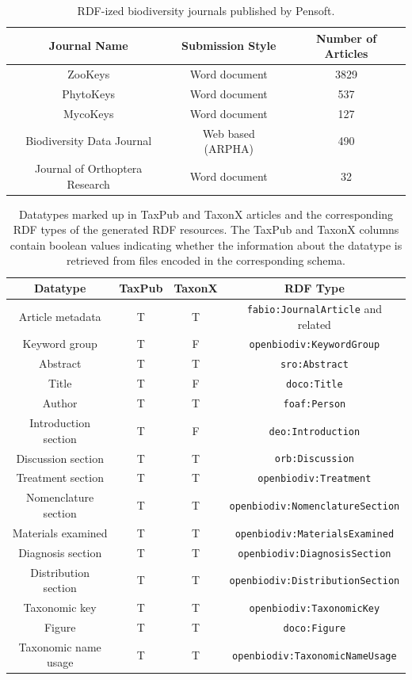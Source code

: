 \begin{table}[h!]
\caption{RDF-ized biodiversity journals published by Pensoft.}
      \begin{tabular}{ccc}
        \hline
          Journal Name             & Submission Style & Number of Articles\\  \hline
          ZooKeys                 & Word document & 3829\\
          PhytoKeys               & Word document & 537\\
          MycoKeys                & Word document & 127\\
          Biodiversity Data Journal & Web based (ARPHA) & 490\\
          Journal of Orthoptera Research & Word document & 32
      \end{tabular}
      \label{rdf-pensoft-journals}
\end{table}

\begin{table}[h!]
\caption{Datatypes marked up in TaxPub and TaxonX articles and the corresponding RDF types of the generated RDF resources. The TaxPub and TaxonX columns contain boolean values indicating whether the information about the datatype is retrieved from files encoded in the corresponding schema.}
      \begin{tabular}{cccc}
        \hline
          Datatype             & TaxPub & TaxonX & RDF Type\\  \hline
          Article metadata     & T & T & {\tt fabio:JournalArticle} and related\\
          Keyword group        & T & F & {\tt openbiodiv:KeywordGroup} \\
          Abstract             & T & T & {\tt sro:Abstract}\\
          Title                & T & F & {\tt doco:Title} \\
          Author               & T & T & {\tt foaf:Person} \\
          Introduction section & T & F & {\tt deo:Introduction}\\
          Discussion section   & T & T & {\tt orb:Discussion}\\
          Treatment section    & T & T & {\tt openbiodiv:Treatment}\\
          Nomenclature section & T & T & {\tt openbiodiv:NomenclatureSection}\\
          Materials examined   & T & T & {\tt openbiodiv:MaterialsExamined}\\
          Diagnosis section    & T & T & {\tt openbiodiv:DiagnosisSection} \\
          Distribution section & T & T & {\tt openbiodiv:DistributionSection}\\
          Taxonomic key        & T & T & {\tt openbiodiv:TaxonomicKey}\\
          Figure               & T & T & {\tt doco:Figure}\\
          Taxonomic name usage & T & T & {\tt openbiodiv:TaxonomicNameUsage}
      \end{tabular}
      \label{datatypes-taxpub-taxonx}
\end{table}

